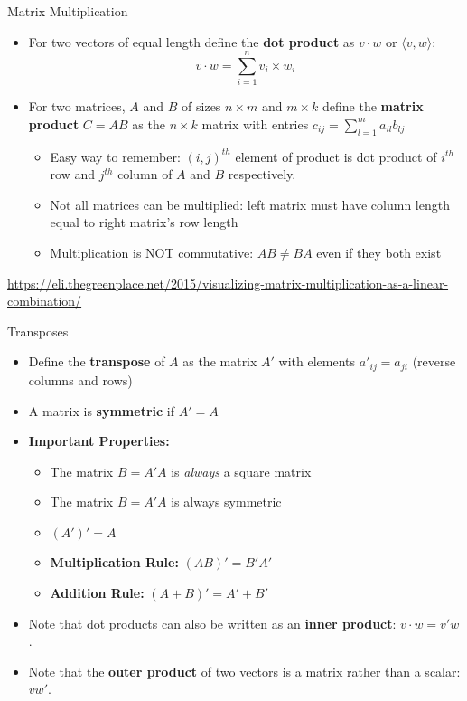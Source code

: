 \documentclass[aspectratio=169,11pt]{beamer}
\begin{document}
\begin{frame}{Matrix Multiplication}
	\begin{itemize}
		\item For two vectors of equal length define the {\bf dot product} as $v\cdot w$ or $\langle v, w \rangle$:
			\[
				v\cdot w = \sum_{i=1}^n v_i\times w_i
			\]
		\item For two matrices, $A$ and $B$ of sizes $n\times m$ and $m\times k$ define the {\bf matrix product} $C=AB$ as the $n\times k$ matrix with entries $c_{ij}=\sum_{l=1}^ma_{il}b_{lj}$
		\begin{itemize}
			\item Easy way to remember: $(i,j)^{th}$ element of product is dot product of $i^{th}$ row and $j^{th}$ column of $A$ and $B$ respectively.
			\item Not all matrices can be multiplied: left matrix must have column length equal to right matrix's row length
			\item Multiplication is NOT commutative: $AB\ne BA$ even if they both exist
		\end{itemize}
	\end{itemize}
	\url{https://eli.thegreenplace.net/2015/visualizing-matrix-multiplication-as-a-linear-combination/}
\end{frame}


\begin{frame}{Transposes}
\begin{itemize}
	\item Define the {\bf transpose} of $A$ as the matrix $A'$ with elements $a'_{ij} = a_{ji}$ (reverse columns and rows)
	\item A matrix is {\bf symmetric} if $A'=A$
	\item {\bf Important Properties:}
		\begin{itemize}
			\item The matrix $B = A'A$ is \emph{always} a square matrix
			\item The matrix $B=A'A$ is always symmetric
			\item $(A')' = A$
			\item {\bf Multiplication Rule:} $(AB)' = B'A'$
			\item {\bf Addition Rule:} $(A+B)' = A'+B'$
		\end{itemize}
	\item Note that dot products can also be written as an {\bf inner product}: $v\cdot w = v' w$.
	\item Note that the {\bf outer product} of two vectors is a matrix rather than a scalar: $v w'$.

\end{itemize}

\end{frame}
\end{document}
